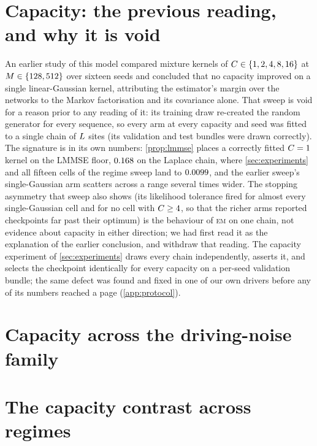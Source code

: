 \section{Capacity: the previous reading, and why it is void}
\label{app:capacity}
An earlier study of this model compared mixture kernels of $C\in\{1,2,4,8,16\}$
at $M\in\{128,512\}$ over sixteen seeds and concluded that no capacity improved on a
single linear-Gaussian kernel, attributing the estimator's margin over the networks to the
Markov factorisation and its covariance alone. That sweep is void for a reason prior to
any reading of it: its training draw re-created the random generator for every sequence,
so every arm at every capacity and seed was fitted to a single chain of $L$ sites
(its validation and test bundles were drawn correctly). The signature is in its own
numbers: \cref{prop:lmmse} places a correctly fitted $C=1$ kernel on the LMMSE floor,
$0.168$ on the Laplace chain, where \cref{sec:experiments} and all fifteen
cells of the regime sweep land to $0.0099$, and the earlier sweep's single-Gaussian
arm scatters across a range several times wider. The stopping asymmetry that sweep also
shows (its likelihood tolerance fired for almost every single-Gaussian cell and for no
cell with $C\ge4$, so that the richer arms reported checkpoints far past their
optimum) is the behaviour of \textsc{em} on one chain, not evidence about capacity in
either direction; we had first read it as the explanation of the earlier conclusion, and
withdraw that reading. The capacity experiment of \cref{sec:experiments} draws every
chain independently, asserts it, and selects the checkpoint identically for every
capacity on a per-seed validation bundle; the same defect was found and fixed in one of
our own drivers before any of its numbers reached a page (\cref{app:protocol}).

\section{Capacity across the driving-noise family}
\label{app:family}

\section{The capacity contrast across regimes}
\label{app:regimes}

